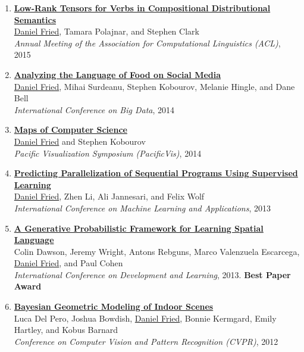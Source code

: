 \begin{enumerate}[leftmargin=-1mm,partopsep=0pt]
\item \href{https://people.eecs.berkeley.edu/~dfried/papers/FPC-verb_tensors.pdf}{\textbf{Low-Rank Tensors for Verbs in Compositional Distributional Semantics}} \\
  \underline{Daniel Fried}, Tamara Polajnar, and Stephen Clark\\
  \emph{Annual Meeting of the Association for Computational Linguistics (ACL)}, 2015

\item \href{https://people.eecs.berkeley.edu/~dfried/papers/Fried-bigdata2014.pdf}{\textbf{Analyzing the Language of Food on Social Media}} \\
  \underline{Daniel Fried}, Mihai Surdeanu, Stephen Kobourov, Melanie Hingle, and Dane Bell\\
  \emph{International Conference on Big Data}, 2014

\item \href{https://arxiv.org/abs/1304.2681}{\textbf{Maps of Computer Science}} \\
  \underline{Daniel Fried} and Stephen Kobourov\\
  \emph{Pacific Visualization Symposium (PacificVis)}, 2014

\item \href{https://people.eecs.berkeley.edu/~dfried/papers/Fried-ICMLA2013.pdf}{\textbf{Predicting Parallelization of Sequential Programs Using Supervised Learning}} \\
  \underline{Daniel Fried}, Zhen Li, Ali Jannesari, and Felix Wolf\\
  \emph{International Conference on Machine Learning and Applications}, 2013

\item \href{https://people.eecs.berkeley.edu/~dfried/papers/ICDL2013.pdf}{\textbf{A Generative Probabilistic Framework for Learning Spatial Language}} \\
  Colin Dawson, Jeremy Wright, Antons Rebguns, Marco Valenzuela Escarcega, \underline{Daniel Fried}, and Paul Cohen\\
  \emph{International Conference on Development and Learning}, 2013. \textbf{Best Paper Award}

\item \href{https://people.eecs.berkeley.edu/~dfried/papers/Del-Pero-CVPR-12.pdf}{\textbf{Bayesian Geometric Modeling of Indoor Scenes}} \\
  Luca Del Pero, Joshua Bowdish, \underline{Daniel Fried}, Bonnie Kermgard, Emily Hartley, and Kobus Barnard\\
  \emph{Conference on Computer Vision and Pattern Recognition (CVPR)}, 2012


\end{enumerate}
